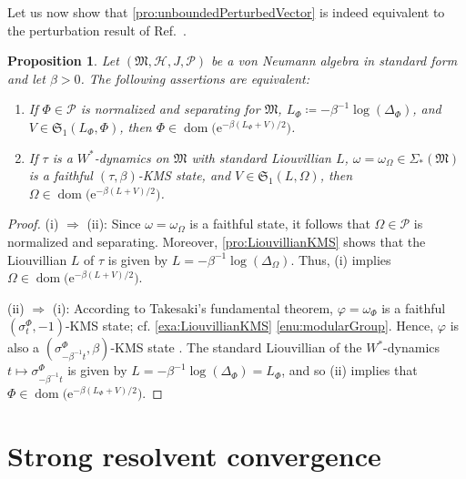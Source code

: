 \documentclass[a4paper, twoside, 11pt, reqno]{amsart}
\theoremstyle{definition}
\theoremstyle{plain}
\newtheorem{proposition}[definition]{Proposition}
\renewcommand{\implies}{\Rightarrow}
\renewcommand{\Delta}{\varDelta}
\renewcommand{\Sigma}{\varSigma}
\renewcommand{\Phi}{\varPhi}
\renewcommand{\Omega}{\varOmega}
\newcommand{\MH}{\mathcal{H}}
\newcommand{\MFM}{\mathfrak{M}}
\newcommand{\MFS}{\mathfrak{S}}
\newcommand{\ee}{\mathrm{e}}
\newcommand{\NS}[1]{\Sigma_{\ast}(#1)}
\newcommand{\NPC}{\mathcal{P}}
\newcommand{\1}{\mathbf{1}}
\DeclareMathOperator{\dom}{dom}
\newcommand{\ce}{\coloneqq}
\newcommand{\inv}[1]{#1^{-1}}
\begin{document}
Let us now show that \cref{pro:unboundedPerturbedVector} is indeed equivalent to the perturbation result of Ref.~\cite[Thm. 5.5 (1)]{DJP03}.

\begin{proposition}\label{pro:equivalencePerturbedVectors}
    Let $(\MFM, \MH, J, \NPC)$ be a von Neumann algebra in standard form and let $\beta > 0$. The following assertions are equivalent:
    \begin{enumerate}[equiv]
        \item If $\Phi \in \NPC$ is normalized and separating for $\MFM$, $L_\Phi \ce - \inv{\beta} \log(\Delta_\Phi)$, and $V \in \MFS_1(L_\Phi, \Phi)$, then $\Phi \in \dom \bigl(\ee^{- \beta (L_\Phi + V) / 2}\bigr)$.
        
        \item If $\tau$ is a $W^\ast$-dynamics on $\MFM$ with standard Liouvillian $L$, $\omega = \omega_\Omega \in \NS{\MFM}$ is a faithful $(\tau, \beta)$-KMS state, and $V \in \MFS_1(L, \Omega)$, then $\Omega \in \dom \bigl(\ee^{- \beta (L + V) / 2}\bigr)$.
    \end{enumerate}
\end{proposition}

\begin{proof}
    (i) $\implies$ (ii): Since $\omega = \omega_\Omega$ is a faithful state, it follows that $\Omega \in \NPC$ is normalized and separating. Moreover, \cref{pro:LiouvillianKMS} shows that the Liouvillian $L$ of $\tau$ is given by $L = - \inv{\beta} \log (\Delta_\Omega)$. Thus, (i) implies $\Omega \in \dom \bigl(\ee^{- \beta (L + V) / 2}\bigr)$.

    (ii) $\implies$ (i): According to Takesaki's fundamental theorem, $\varphi = \omega_\Phi$ is a faithful $(\sigma_t^\Phi, -1)$-KMS state; cf. \cref{exa:LiouvillianKMS} \ref{enu:modularGroup}. Hence, $\varphi$ is also a $(\sigma_{- \inv{\beta} t}^\Phi, \beta)$-KMS state \cite[p. 78]{BR2}. The standard Liouvillian of the $W^\ast$-dynamics $t \mapsto \sigma_{- \inv{\beta} t}^\Phi$ is given by $L = - \inv{\beta} \log(\Delta_\Phi) = L_\Phi$, and so (ii) implies that $\Phi \in \dom \bigl(\ee^{- \beta (L_\Phi + V) / 2}\bigr)$.
\end{proof}



\section{Strong resolvent convergence}\label{app:SRconvergence}
\end{document}
